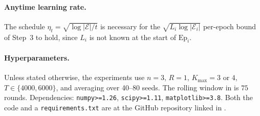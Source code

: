 \documentclass[letterpaper,9pt,twocolumn]{extarticle}
\newcommand{\cE}{\mathcal{E}}
\newcommand{\Kmax}{K_{\max}}
\theoremstyle{plain}
\theoremstyle{definition}
\theoremstyle{remark}
\begin{document}
\paragraph{Anytime learning rate.}
The schedule $\eta_t=\sqrt{\log|\cE|/t}$ \citep[\S 2]{cesa2006} is
necessary for the $\sqrt{L_i\log|\cE_i|}$ per-epoch bound of Step~3 to
hold, since $L_i$ is not known at the start of $\mathrm{Ep}_i$.

\paragraph{Hyperparameters.}
Unless stated otherwise, the experiments use $n=3$, $R=1$, $\Kmax=3$ or
$4$, $T\in\{4000,6000\}$, and averaging over 40--80 seeds. The rolling
window in  is $75$ rounds. Dependencies:
\texttt{numpy>=1.26}, \texttt{scipy>=1.11}, \texttt{matplotlib>=3.8}.
Both the code and a \texttt{requirements.txt} are at the GitHub repository
linked in .
\end{document}
